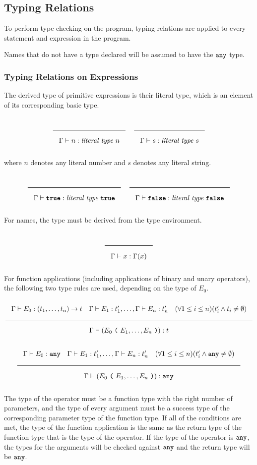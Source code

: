 \subsection{Typing Relations}
\label{typing-rules}

To perform type checking on the program, typing relations are applied to every statement and expression in the program.

Names that do not have a type declared will be assumed to have the $\texttt{any}$ type.

\subsubsection{Typing Relations on Expressions}

The derived type of primitive expressions is their literal type, which is an element of its corresponding basic type.

\noindent
\[
  \Rule{}{\Gamma \vdash n : \textit{literal type}\ n}
  \quad
  \Rule{}{\Gamma \vdash s : \textit{literal type}\ s}
\]
\noindent

where $n$ denotes any literal number and $s$ denotes any literal string.

\noindent
\[
  \Rule{}{\Gamma \vdash \TruE : \textit{literal type}\ \TruE}
  \quad
  \Rule{}{\Gamma \vdash \FalsE : \textit{literal type}\ \FalsE}
\]
\noindent

For names, the type must be derived from the type environment.

\noindent
\[
  \Rule{}{\Gamma \vdash x : \Gamma(x)}
\]
\noindent

For function applications (including applications of binary and unary operators), the following two type rules are used, depending on the type of $E_0$.

\noindent
\[
\Rule{\Gamma \vdash E_0 : (t_1, \ldots, t_n) \rightarrow t \quad \Gamma \vdash E_1 : t'_1, \ldots,  \Gamma \vdash E_n : t'_n
  \quad (\forall 1 \leq i \leq n)(t'_i \wedge t_i \neq \emptyset)}{\Gamma \vdash (E_0\ \Lp \ E_1, \ldots, E_n\ \Rp) : t}
\]
\noindent
\[
  \Rule{\Gamma \vdash E_0 : \Any \quad \Gamma \vdash E_1 : t'_1, \ldots,  \Gamma \vdash E_n : t'_n
  \quad (\forall 1 \leq i \leq n)(t'_i \wedge \Any \neq \emptyset)}{\Gamma \vdash (E_0\ \Lp \ E_1, \ldots, E_n\ \Rp) : \Any}
\]
\noindent

The type of the operator must be a function type with the right number of parameters,
and the type of every argument must be a success type of the corresponding parameter type of the function type.
If all of the conditions are met, the type of the function application is the same
as the return type of the function type that is the type of the operator.
If the type of the operator is $\texttt{any}$, the types for the arguments will be checked against $\texttt{any}$ and the return type will be $\texttt{any}$.

